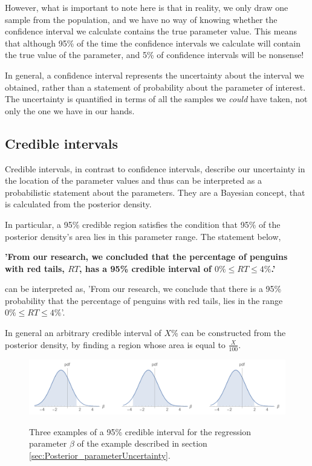 \documentclass[11pt,fullpage]{book}
\begin{document}
However, what is important to note here is that in reality, we only draw one sample from the population, and we have no way of knowing whether the confidence interval we calculate contains the true parameter value. This means that although 95\% of the time the confidence intervals we calculate will contain the true value of the parameter, and 5\% of confidence intervals will be nonsense!

In general, a confidence interval represents the uncertainty about the interval we obtained, rather than a statement of probability about the parameter of interest. The uncertainty is quantified in terms of all the samples we \textit{could} have taken, not only the one we have in our hands.

\subsection{Credible intervals}
Credible intervals, in contrast to confidence intervals, describe our uncertainty in the location of the parameter values and thus can be interpreted as a probabilistic statement about the parameters. They are a Bayesian concept, that is calculated from the posterior density.

In particular, a 95\% credible region satisfies the condition that 95\% of the posterior density's area lies in this parameter range. The statement below,

\textbf{'From our research, we concluded that the percentage of penguins with red tails, $RT$, has a 95\% credible interval of $0\%\leq RT \leq 4\%$.'}

can be interpreted as, 'From our research, we conclude that there is a 95\% probability that the percentage of penguins with red tails, lies in the range $0\%\leq RT \leq 4\%$'.

In general an arbitrary credible interval of $X$\% can be constructed from the posterior density, by finding a region whose area is equal to $\frac{X}{100}$. 

\begin{figure}
\centering
\scalebox{0.35} 
{\includegraphics{Posterior_infiniteCredibleIntervals.pdf}}
\caption{Three examples of a 95\% credible interval for the regression parameter $\beta$ of the example described in section \ref{sec:Posterior_parameterUncertainty}.}\label{fig:Posterior_infiniteCredibleIntervals}
\end{figure}
\end{document}
